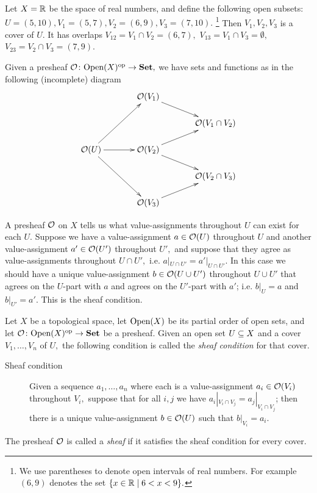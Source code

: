 \documentclass[CT4S-EN-RU]{subfiles}
\begin{document}
\begin{exampleENG}\label{ex:open cover}
Let $X=\RR$ be the space of real numbers, and define the following open subsets: $U=(5,10), V_1=(5,7), V_2=(6,9), V_3=(7,10).$
\footnote{We use parentheses to denote open intervals of real numbers. For example $(6,9)$ denotes the set $\{x\in\RR\|6<x<9\}.$} 
Then $V_1, V_2, V_3$ is a cover of $U.$ It has overlaps $V_{12}=V_1\cap V_2=(6,7),$ $V_{13}=V_1\cap V_3=\emptyset,$ $V_{23}=V_2\cap V_3=(7,9).$ 

Given a presheaf $\mcO\taking\Op(X)\op\to\Set,$ we have sets and functions as in the following (incomplete) diagram
$$
\xymatrix@=15pt{
&&\mcO(V_1)\ar[drr]\\
&&&&\mcO(V_1\cap V_2)\\
\mcO(U)\ar[uurr]\ar[rr]\ar[ddrr]&&\mcO(V_2)\ar[urr]\ar[drr]\\
&&&&\mcO(V_2\cap V_3)\\
&&\mcO(V_3)\ar[urr]
}
$$
\end{exampleENG}

\begin{exampleRUS}\label{ex:open cover}
\end{exampleRUS}

\begin{blockENG}
A presheaf $\mcO$ on $X$ tells us what value-assignments throughout $U$ can exist for each $U.$ Suppose we have a value-assignment $a\in\mcO(U)$ throughout $U$ and another value-assignment $a'\in\mcO(U')$ throughout $U',$ and suppose that they agree as value-assignments throughout $U\cap U',$ i.e. $a|_{U\cap U'}=a'|_{U\cap U'}.$ In this case we should have a unique value-assignment $b\in\mcO(U\cup U')$ throughout $U\cup U'$ that agrees on the $U$-part with $a$ and agrees on the $U'$-part with $a'$; i.e. $b|_U=a$ and $b|_{U'}=a'.$ This is the sheaf condition. 
\end{blockENG}

\begin{blockRUS}
\end{blockRUS}

\begin{definitionENG}\label{def:sheaf}
Let $X$ be a topological space, let $\Op(X)$ be its partial order of open sets, and let $\mcO\taking\Op(X)\op\to\Set$ be a presheaf. Given an open set $U\ss X$ and a cover $V_1,\ldots, V_n$ of $U,$ the following condition is called the {\em sheaf condition} for that cover. 
\begin{description}
\item [Sheaf condition] Given a sequence $a_1,\ldots,a_n$ where each is a value-assignment $a_i\in\mcO(V_i)$ throughout $V_i,$ suppose that for all $i,j$ we have $a_i|_{V_i\cap V_j}=a_j|_{V_i\cap V_j}$; then there is a unique value-assignment $b\in\mcO(U)$ such that $b|_{V_i}=a_i.$
\end{description}
The presheaf $\mcO$ is called a {\em sheaf} if it satisfies the sheaf condition for every cover.
\end{definitionENG}
\end{document}
